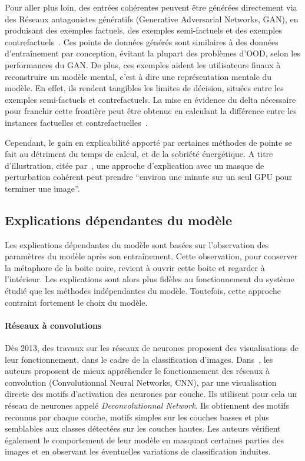 Pour aller plus loin, des entrées cohérentes peuvent être générées directement via des Réseaux antagonistes génératifs (Generative Adversarial Networks, GAN), en produisant des exemples factuels, des exemples semi-factuels et des exemples contrefactuels~\cite{Kenny2021,Charachon2021}. Ces points de données générés sont similaires à des données d'entraînement par conception, évitant la plupart des problèmes d'OOD, selon les performances du GAN. De plus, ces exemples aident les utilisateurs finaux à reconstruire un modèle mental, c'est à dire une représentation mentale du modèle. En effet, ils rendent tangibles les limites de décision, situées entre les exemples semi-factuels et contrefactuels. La mise en évidence du delta nécessaire pour franchir cette frontière peut être obtenue en calculant la différence entre les instances factuelles et contrefactuelles~\cite{Charachon2021}.

Cependant, le gain en explicabilité apporté par certaines méthodes de pointe se fait au détriment du temps de calcul, et de la sobriété énergétique. A titre d'illustration, citée par~\cite{Chang2019}, une approche d'explication avec un masque de perturbation cohérent peut prendre ``environ une minute sur un seul GPU pour terminer une image''.



\subsection{Explications dépendantes du modèle}

Les explications dépendantes du modèle sont basées sur l'observation des paramètres du modèle après son entraînement. Cette observation, pour conserver la métaphore de la boite noire, revient à ouvrir cette boite et regarder à l'intérieur. Les explications sont alors plus fidèles au fonctionnement du système étudié que les méthodes indépendantes du modèle. Toutefois, cette approche contraint fortement le choix du modèle.

\paragraph{Réseaux à convolutions}
Dès 2013, des travaux sur les réseaux de neurones proposent des visualisations de leur fonctionnement, dans le cadre de la classification d'images. Dans~\cite{Zeiler2014}, les auteurs proposent de mieux appréhender le fonctionnement des réseaux à convolution (Convolutionnal Neural Networks, CNN), par une visualisation directe des motifs d'activation des neurones par couche. Ils utilisent pour cela un réseau de neurones appelé \textit{Deconvolutionnal Network}. Ils obtiennent des motifs reconnus par chaque couche, motifs simples sur les couches basses et plus semblables aux classes détectées sur les couches hautes. Les auteurs vérifient également le comportement de leur modèle en masquant certaines parties des images et en observant les éventuelles variations de classification induites.

